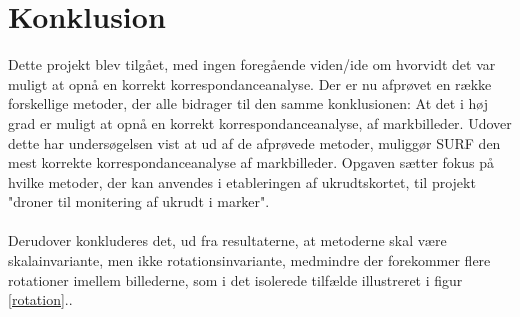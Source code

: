 \chapter{Konklusion}
Dette projekt blev tilgået, med ingen foregående viden/ide om hvorvidt det var muligt at opnå en korrekt korrespondanceanalyse. Der er nu afprøvet en række forskellige metoder, der alle bidrager til den samme konklusionen: At det i høj grad er muligt at opnå en korrekt korrespondanceanalyse, af markbilleder. Udover dette har undersøgelsen vist at ud af de afprøvede metoder, muliggør SURF den mest korrekte korrespondanceanalyse af markbilleder. Opgaven sætter fokus på hvilke metoder, der kan anvendes i etableringen af ukrudtskortet, til projekt "droner til monitering af ukrudt i marker". \\ \\ 
Derudover konkluderes det, ud fra resultaterne, at metoderne skal være skalainvariante, men ikke rotationsinvariante, medmindre der forekommer flere rotationer imellem billederne, som i det isolerede tilfælde illustreret i figur \ref{rotation}..




